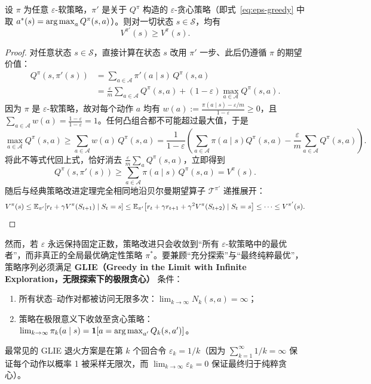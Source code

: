 \begin{thmBox}
\begin{theorem}
\label{thm:eps-soft-imp}
设 $\pi$ 为任意 $\varepsilon$-软策略，$\pi'$ 是关于 $Q^\pi$ 构造的 $\varepsilon$-贪心策略（即式~\eqref{eq:eps-greedy} 中取 $a^*(s) = \operatorname*{arg\,max}_a Q^\pi(s, a)$）。则对一切状态 $s \in \mathcal{S}$，均有
\[
  V^{\pi'}(s) \ge V^\pi(s).
\]
\end{theorem}
\begin{proof}
对任意状态 $s \in \mathcal{S}$，直接计算在状态 $s$ 改用 $\pi'$ 一步、此后仍遵循 $\pi$ 的期望价值：
\begin{align*}
  Q^\pi(s, \pi'(s))
  &= \sum_{a \in \mathcal{A}} \pi'(a \mid s)\, Q^\pi(s, a) \\
  &= \frac{\varepsilon}{m} \sum_{a \in \mathcal{A}} Q^\pi(s, a) + (1 - \varepsilon) \max_{a \in \mathcal{A}} Q^\pi(s, a).
\end{align*}
因为 $\pi$ 是 $\varepsilon$-软策略，故对每个动作 $a$ 均有 $w(a) := \frac{\pi(a \mid s) - \varepsilon/m}{1 - \varepsilon} \ge 0$，且 $\sum_{a \in \mathcal{A}} w(a) = \frac{1 - \varepsilon}{1 - \varepsilon} = 1$。任何凸组合都不可能超过最大值，于是
\[
  \max_{a \in \mathcal{A}} Q^\pi(s, a) \ge \sum_{a \in \mathcal{A}} w(a)\, Q^\pi(s, a)
  = \frac{1}{1 - \varepsilon}\!\left(\sum_{a \in \mathcal{A}} \pi(a \mid s) Q^\pi(s, a) - \frac{\varepsilon}{m}\sum_{a \in \mathcal{A}} Q^\pi(s, a)\right).
\]
将此不等式代回上式，恰好消去 $\frac{\varepsilon}{m}\sum_a Q^\pi(s, a)$，立即得到
\[
  Q^\pi(s, \pi'(s)) \ge \sum_{a \in \mathcal{A}} \pi(a \mid s)\, Q^\pi(s, a) = V^\pi(s).
\]
随后与经典策略改进定理完全相同地沿贝尔曼期望算子 $\mathcal{T}^{\pi'}$ 递推展开：
\[
  V^\pi(s) \le \mathbb{E}_{\pi'}\!\left[r_t + \gamma V^\pi(S_{t+1}) \mid S_t = s\right]
  \le \mathbb{E}_{\pi'}\!\left[r_t + \gamma r_{t+1} + \gamma^2 V^\pi(S_{t+2}) \mid S_t = s\right]
  \le \cdots \le V^{\pi'}(s). \qedhere
\]
\end{proof}
\end{thmBox}

然而，若 $\varepsilon$ 永远保持固定正数，策略改进只会收敛到“所有 $\varepsilon$-软策略中的最优者”，而非真正的全局最优确定性策略 $\pi^*$。要兼顾“充分探索”与“最终纯粹最优”，策略序列必须满足 \textbf{GLIE（Greedy in the Limit with Infinite Exploration，无限探索下的极限贪心）} 条件：
\begin{enumerate}
  \item 所有状态--动作对都被访问无限多次：$\lim_{k \to \infty} N_k(s, a) = \infty$；
  \item 策略在极限意义下收敛至贪心策略：$\lim_{k \to \infty} \pi_k(a \mid s) = \mathbf{1}\!\left[a = \operatorname*{arg\,max}_{a'} Q_k(s, a')\right]$。
\end{enumerate}
最常见的 GLIE 退火方案是在第 $k$ 个回合令 $\varepsilon_k = 1/k$（因为 $\sum_{k=1}^\infty 1/k = \infty$ 保证每个动作以概率 1 被采样无限次，而 $\lim_{k\to\infty} \varepsilon_k = 0$ 保证最终归于纯粹贪心）。

